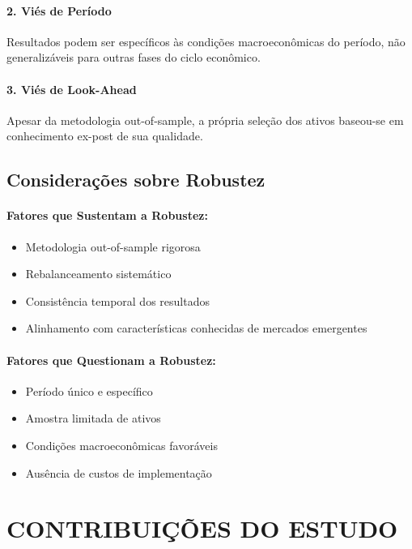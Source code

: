 \paragraph{2. Viés de Período}
Resultados podem ser específicos às condições macroeconômicas do período, não generalizáveis para outras fases do ciclo econômico.

\paragraph{3. Viés de Look-Ahead}
Apesar da metodologia out-of-sample, a própria seleção dos ativos baseou-se em conhecimento ex-post de sua qualidade.

\subsection{Considerações sobre Robustez}

\paragraph{Fatores que Sustentam a Robustez:}
\begin{itemize}
    \item Metodologia out-of-sample rigorosa
    \item Rebalanceamento sistemático
    \item Consistência temporal dos resultados
    \item Alinhamento com características conhecidas de mercados emergentes
\end{itemize}

\paragraph{Fatores que Questionam a Robustez:}
\begin{itemize}
    \item Período único e específico
    \item Amostra limitada de ativos
    \item Condições macroeconômicas favoráveis
    \item Ausência de custos de implementação
\end{itemize}

\section{CONTRIBUIÇÕES DO ESTUDO}

